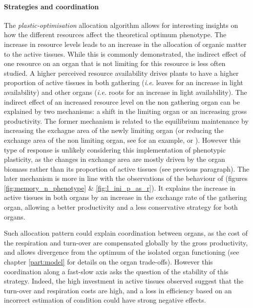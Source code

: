 \paragraph{Strategies and coordination}

The \textit{plastic-optimisation} allocation algorithm allows for interesting insights on how the different resources affect the theoretical optimum phenotype. The increase in resource levels leads to an increase in the allocation of organic matter to the active tissues. While this is commonly demonstrated, the indirect effect of one resource on an organ that is not limiting for this resource is less often studied. A higher perceived resource availability drives plants to have a higher proportion of active tissues in both gathering (\textit{i.e.} leaves for an increase in light availability) and other organs (\textit{i.e.} roots for an increase in light availability). The indirect effect of an increased resource level on the non gathering organ can be explained by two mechanisms: a shift in the limiting organ or an increasing gross productivity. The former mechanism is related to the equilibrium maintenance by increasing the exchagne area of the newly limiting organ (or reducing the exchange area of the non limiting organ, see \cite{liu_biomass_2004} for an example, or \cite{grassein_plant_2010}). However this type of response is unlikely considering this implementation of phenotypic plasticity, as the changes in exchange area are mostly driven by the organ biomass rather than its proportion of active tissues (see previous paragraph). The later mechanism is more in line with the observations of the behaviour of \model (figures \ref{fig:memory_n_phenotype} \& \ref{fig:l_ini_p_as_r}). It explains the increase in active tissues in both organs by an increase in the exchange rate of the gathering organ, allowing a better productivity and a less conservative strategy for both organs. 

Such allocation pattern could explain coordination between organs, as the cost of the respiration and turn-over are compensated globally by the gross productivity, and allows divergence from the optimum of the isolated organ functioning (see chapter \ref{part:model} for details on the organ trade-offs). However this coordination along a fast-slow axis asks the question of the stability of this strategy. Indeed, the high investment in active tissues observed suggest that the turn-over and respiration costs are high, and a loss in efficiency based on an incorrect estimation of condition could have strong negative effects. 



